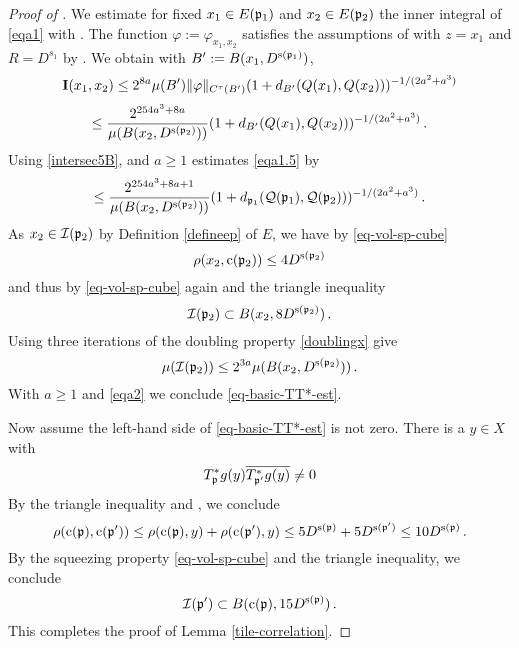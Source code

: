 \begin{proof}[Proof of ]
We estimate for fixed $x_1\in E({\mathfrak p}_1)$ and
$x_2\in E({\mathfrak p}_2)$ the inner integral of \eqref{eqa1} with
. The function
$\varphi:=\varphi_{x_1,x_2}$ satisfies the assumptions of
 with $z = x_1$ and $R = D^{s_1}$ by .
We obtain with $B':= B(x_1, D^{{\mathrm{s}}({\mathfrak p}_1)})$,
\begin{equation*}
 {\bf I}(x_1, x_2) \le 2^{8a} \mu(B') \|{\varphi}\|_{C^\tau(B')}
       (1 + d_{B'}({Q}(x_1),{Q}(x_2)))^{-1/(2a^2+a^3)}
\end{equation*}
\begin{equation}
\label{eqa1.5}
 \le \frac{2^{254a^3+8a}}
 {\mu(B(x_2, D^{{\mathrm{s}}({\mathfrak p}_2)}))}
       (1 + d_{B'}({Q}(x_1),{Q}(x_2)))^{-1/(2a^2+a^3)}\,.
\end{equation}
Using \eqref{intersec5B},  and $a\ge 1$ estimates \eqref{eqa1.5} by
\begin{equation}\label{eqa2}
 \le \frac{2^{254a^3 + 8a + 1}}
 {\mu(B(x_2, D^{{\mathrm{s}}({\mathfrak p}_2)}))}
       (1+d_{{\mathfrak p}_1}({\mathcal{Q}}({\mathfrak p}_1), {\mathcal{Q}}({\mathfrak p}_2)))^{-1/(2a^2+a^3)}\,.
\end{equation}
As $x_2\in {\mathcal{I}}({\mathfrak p}_2)$ by Definition \eqref{defineep} of $E$, we have by \eqref{eq-vol-sp-cube}
\begin{equation}
    \rho(x_2,{\mathrm{c}}({\mathfrak p}_2))\le 4D^{{\mathrm{s}}({\mathfrak p}_2)}
\end{equation}
and thus by \eqref{eq-vol-sp-cube} again and the triangle inequality
\begin{equation}
    {\mathcal{I}}({\mathfrak p}_2)\subset B(x_2,8D^{{\mathrm{s}}({\mathfrak p}_2)})\, .
\end{equation}
Using three iterations of the doubling property \eqref{doublingx} give
\begin{equation}
    \mu({\mathcal{I}}({\mathfrak p}_2))\le 2^{3a}\mu(B(x_2,D^{{\mathrm{s}}({\mathfrak p}_2)}))\, .
\end{equation}
With $a\ge 1$ and \eqref{eqa2} we conclude \eqref{eq-basic-TT*-est}.


Now assume the left-hand side of \eqref{eq-basic-TT*-est} is not zero.
There is a $y\in X$ with
\begin{equation}
    T^*_{{\mathfrak p}}g(y)\overline{T^*_{{\mathfrak p}'}g(y)}\neq 0
\end{equation}
By the triangle inequality and , we conclude
\begin{equation}
   \rho({\mathrm{c}}({\mathfrak p}),{\mathrm{c}}({\mathfrak p}'))\le \rho({\mathrm{c}}({\mathfrak p}),y) +\rho({\mathrm{c}}({\mathfrak p}'),y)
   \le 5D^{{\mathrm{s}}({\mathfrak p})}+5D^{{\mathrm{s}}({\mathfrak p}')}\le 10 D^{{\mathrm{s}}({\mathfrak p})}\, .
\end{equation}
By the squeezing property \eqref{eq-vol-sp-cube} and the triangle inequality,
we conclude
\begin{equation}
    {\mathcal{I}}({\mathfrak p}') \subset B({\mathrm{c}}({\mathfrak p}), 15D^{{\mathrm{s}}({\mathfrak p})})\, .
\end{equation}
   This completes the proof of Lemma \ref{tile-correlation}.
\end{proof}




